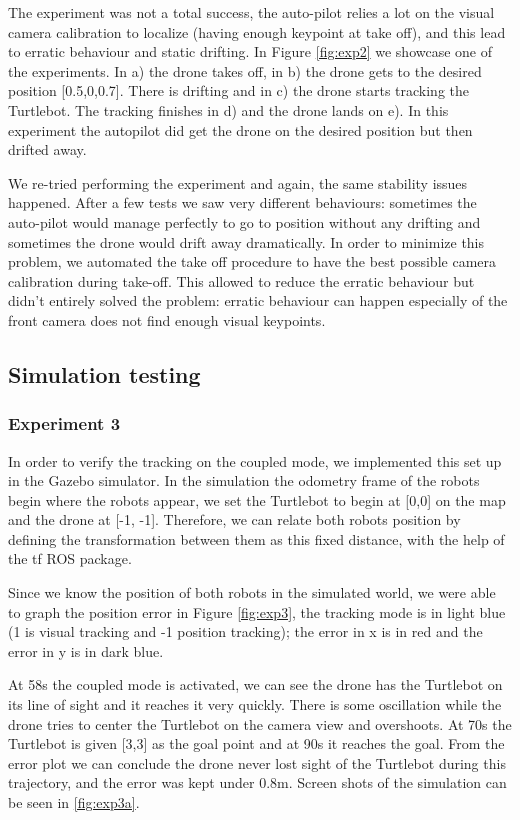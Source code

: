 \documentclass[11pt,a4paper]{article}
\begin{document}
The experiment was not a total success, the auto-pilot relies a lot on the visual camera calibration to 
localize (having enough keypoint at take off), and this lead to erratic behaviour and static drifting.
In Figure \ref{fig:exp2} we showcase one of the experiments. In a) the drone takes off, in b) the drone gets to the desired position [0.5,0,0.7]. There is drifting and in c) the drone starts tracking the Turtlebot. The tracking finishes in d) and the drone lands on e). In this experiment the autopilot did get the drone on the desired position but then drifted away. 


We re-tried performing the experiment and again, the same stability issues happened. After a few tests we 
saw very different behaviours: sometimes the auto-pilot would manage perfectly to go to position without any
drifting and sometimes the drone would drift away dramatically. In order to minimize this problem, we 
automated the take off procedure to have the best possible camera calibration during take-off. This 
allowed to reduce the erratic behaviour but didn't entirely solved the problem: erratic behaviour can happen
especially of the front camera does not find enough visual keypoints.

\subsection{Simulation testing}
\subsubsection{Experiment 3}
In order to verify the tracking on the coupled mode, we implemented this set up in the Gazebo simulator. 
In the simulation the odometry frame of the robots begin where the robots appear, we set the Turtlebot to begin at [0,0] on the map and the drone at [-1, -1]. Therefore, we can relate both robots position by defining the transformation between them as this fixed distance, with the help of the tf ROS package.

Since we know the position of both robots in the simulated world, we were able to graph the position error in Figure \ref{fig:exp3}, the tracking mode is in light blue (1 is visual tracking and -1 position tracking); the error in x is in red and the error in y is in dark blue. 

At 58s the coupled mode is activated, we can see the drone has the Turtlebot on its line of sight and it reaches it very quickly. There is some oscillation while the drone tries to center the Turtlebot on the camera view and overshoots. At 70s the Turtlebot is given [3,3] as the goal point and at 90s it reaches the goal. From the error plot we can conclude the drone never lost sight of the Turtlebot during this trajectory,  and the error was kept under 0.8m.  Screen shots of the simulation can be seen in \ref{fig:exp3a}.
\end{document}
